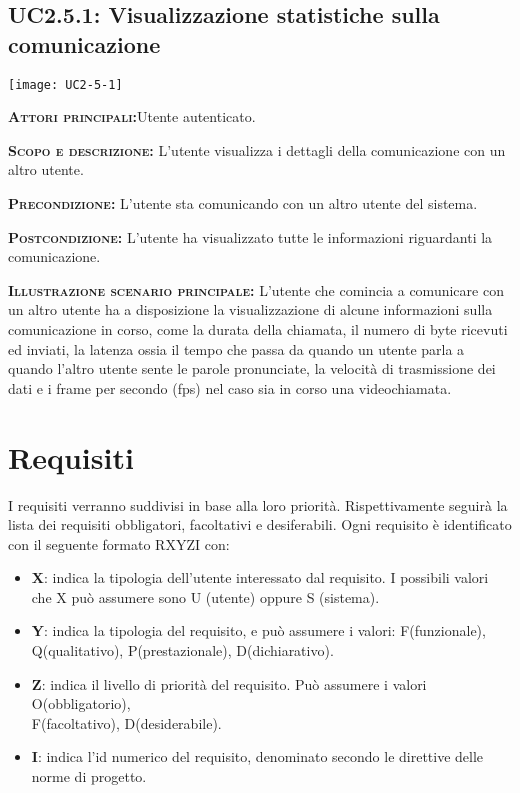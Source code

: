 \subsection{UC2.5.1: Visualizzazione statistiche sulla comunicazione}
\begin{center}
\texttt{[image: UC2-5-1]}
\end{center}
\begin{description}
\item{\scshape\bfseries Attori principali:}Utente autenticato.
\item{\scshape\bfseries Scopo e descrizione:} L'utente visualizza i dettagli della comunicazione con un altro utente.
\item{\scshape\bfseries Precondizione:} L'utente sta comunicando con un altro utente del sistema.
\item{\scshape\bfseries Postcondizione:} L'utente ha visualizzato tutte le informazioni riguardanti la comunicazione.
\item{\scshape\bfseries Illustrazione scenario principale:} L'utente che comincia a comunicare con un altro utente ha a disposizione la visualizzazione di alcune informazioni sulla comunicazione in corso, come la durata della chiamata, il numero di byte ricevuti ed inviati, la latenza ossia il tempo che passa da quando un utente parla a quando l'altro utente sente le parole pronunciate, la velocità di trasmissione dei dati e i frame per secondo (fps) nel caso sia in corso una videochiamata.
\end{description}

\newpage\section{Requisiti}

I requisiti verranno suddivisi in base alla loro priorità. Rispettivamente seguirà la lista dei requisiti obbligatori, facoltativi e desiferabili. Ogni requisito è identificato con il seguente formato RXYZI con:


		\begin{itemize}

			\item \textbf{X}: indica la tipologia dell'utente interessato dal requisito. I possibili valori che X può assumere sono U (utente) oppure S (sistema).

			\item \textbf{Y}: indica la tipologia del requisito, e può assumere i valori: F(funzionale), Q(qualitativo), P(prestazionale), D(dichiarativo).

			\item \textbf{Z}: indica il livello di priorità del requisito. Può assumere i valori O(obbligatorio), \\F(facoltativo), D(desiderabile).

			\item \textbf{I}: indica l'id numerico del requisito, denominato secondo le direttive delle norme di progetto.

		\end{itemize}


